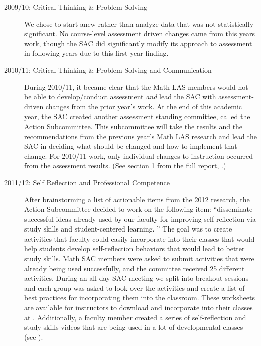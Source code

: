 \begin{description}
	\item[2009/10: Critical Thinking \& Problem Solving]

	      We chose to start anew rather than analyze data that was not statistically significant.
	      No course-level assessment driven changes came from this years work, though the SAC did significantly modify its approach to assessment in following years due to this first year finding.

	\item[2010/11:  Critical Thinking \& Problem Solving and Communication]

	      During 2010/11, it became clear that the Math LAS members would not be able to develop/conduct assessment \emph{and} lead the SAC with assessment-driven changes from the prior year's work.
	      At the end of this academic year, the SAC created another assessment standing committee, called the Action Subcommittee.
	      This subcommittee will take the results and the recommendations from the previous year's Math LAS research and lead the SAC in deciding what should be changed and how to implement that change.
	      For 2010/11 work, only individual changes to instruction occurred from the assessment results.
	      (See section 1 from the full report, \cite{annualLASreport2010}.)

	\item[2011/12: Self Reflection and Professional Competence]

	      After brainstorming a list of actionable items from the 2012 research, the Action Subcommittee decided to work on the following item: ``disseminate successful ideas already used by our faculty for improving self-reflection via study skills and student-centered learning.
	      ''  The goal was to create activities that faculty
	      could easily incorporate into their classes that would help students develop
	      self-reflection behaviors that would lead to better study skills.
	      Math SAC members were asked to submit activities that were already being used successfully, and the committee received 25 different activities.
	      During an all-day SAC meeting we split into breakout sessions and each group was asked to look over the activities and create a list of best practices for incorporating them into the classroom.
	      These worksheets are available for instructors to download and incorporate into their classes at \cite{selfcenteredlearning}.
	      Additionally, a faculty member created a series of self-reflection and study skills videos that are being used in a lot of developmental classes (see ).


\end{description}
